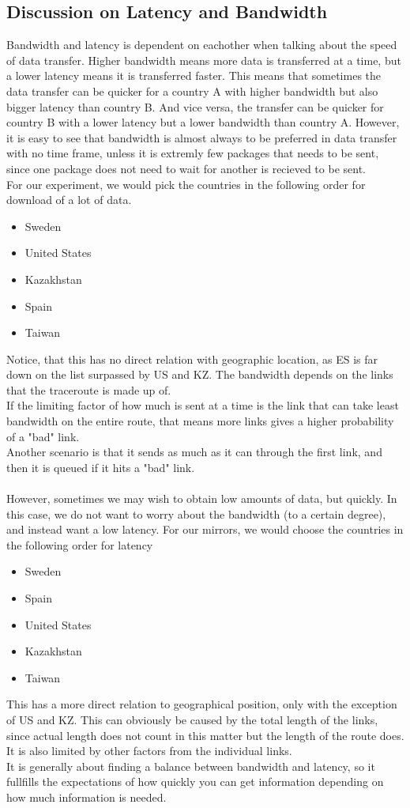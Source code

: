 \documentclass{acm_proc_article-sp}
\begin{document}
\subsection{Discussion on Latency and Bandwidth}\label{2}
Bandwidth and latency is dependent on eachother when talking about the speed of data transfer. Higher bandwidth means more data is transferred at a time, but a lower latency means it is transferred faster. This means that sometimes the data transfer can be quicker for a country A with higher bandwidth but also bigger latency than country B. And vice versa, the transfer can be quicker for country B with a lower latency but a lower bandwidth than country A. However, it is easy to see that bandwidth is almost always to be preferred in data transfer with no time frame, unless it is extremly few packages that needs to be sent, since one package does not need to wait for another is recieved to be sent.\\
For our experiment, we would pick the countries in the following order for download of a lot of data.
\begin{itemize}
\item Sweden
\item United States
\item Kazakhstan
\item Spain
\item Taiwan
\end{itemize}
Notice, that this has no direct relation with geographic location, as ES is far down on the list surpassed by US and KZ. The bandwidth depends on the links that the traceroute is made up of.\\ If the limiting factor of how much is sent at a time is the link that can take least bandwidth on the entire route, that means more links gives a higher probability of a "bad" link.\\
Another scenario is that it sends as much as it can through the first link, and then it is queued if it hits a "bad" link.\\
\\
However, sometimes we may wish to obtain low amounts of data, but quickly. In this case, we do not want to worry about the bandwidth (to a certain degree), and instead want a low latency. For our mirrors, we would choose the countries in the following order for latency
\begin{itemize}
\item Sweden
\item Spain
\item United States
\item Kazakhstan
\item Taiwan
\end{itemize}
This has a more direct relation to geographical position, only with the exception of US and KZ. This can obviously be caused by the total length of the links, since actual length does not count in this matter but the length of the route does. It is also limited by other factors from the individual links.\\
It is generally about finding a balance between bandwidth and latency, so it fullfills the expectations of how quickly you can get information depending on how much information is needed.
\end{document}
